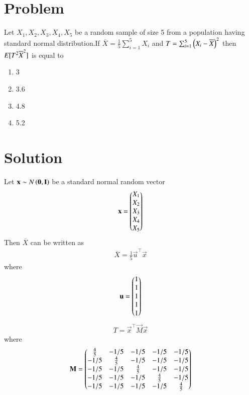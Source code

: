 \documentclass[journal,12pt,twocolumn]{IEEEtran}
\begin{document}
\section{Problem}
Let $X_1,X_2,X_3,X_4,X_5$ be a random sample of size 5 from a population having standard normal distribution.If 
$\overline{X}=\frac{1}{5}\sum_{i=1}^5 X_i$ and $T=\sum_{i=1}^5\left(X_i-\overline{X}\right)^2$
then $E[ T^2\overline{X}^2 ]$ is equal to 
\begin{enumerate}
    \item 3
    \item 3.6
    \item 4.8
    \item 5.2
\end{enumerate}
\section{Solution}
Let $\mathbf{x} \sim N\left(\mathbf{0},\mathbf{I}\right)$ be a standard normal random vector 
\begin{align}
    \mathbf{x}=\begin{pmatrix}X_1\\
             X_2\\
             X_3\\
             X_4\\
             X_5\end{pmatrix}
\end{align}
Then $\overline{X}$ can be written as
\begin{align}
    \overline{X}=\frac{1}{5}\vec{u}^{\top}\vec{x}
\end{align}
where 
\begin{align}
    \mathbf{u}=\begin{pmatrix}1\\
                      1\\
                      1\\
                      1\\
                      1\end{pmatrix}
\end{align} 
\begin{align}
   T=\vec{x}^{\top}\vec{M}\vec{x}
\end{align}
where
\begin{align}
    \mathbf{M}&=\begin{pmatrix}\frac{4}{5}&-1/5&-1/5&-1/5&-1/5\\
                   -1/5&\frac{4}{5}&-1/5&-1/5&-1/5\\
                   -1/5&-1/5&\frac{4}{5}&-1/5&-1/5\\
                   -1/5&-1/5&-1/5&\frac{4}{5}&-1/5\\
                   -1/5&-1/5&-1/5&-1/5&\frac{4}{5}\end{pmatrix}\\
\end{align}
\end{document}
